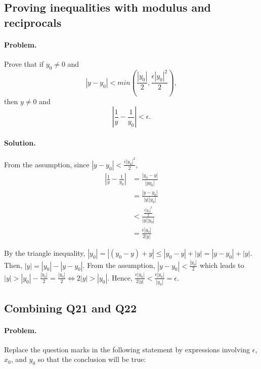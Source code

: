 \documentclass{article}
\begin{document}
\setcounter{subsection}{21}
\subsection{Proving inequalities with modulus and reciprocals}

\paragraph{Problem.} Prove that if $y_0 \neq 0$ and \begin{equation*}
  |y - y_0| < min\left(\frac{|y_0|}{2}, \frac{\epsilon|y_0|^2}{2}\right),
\end{equation*} then $y \neq 0$ and \begin{equation*}
  \left|\frac{1}{y} - \frac{1}{y_0}\right| < \epsilon.
\end{equation*}

\paragraph{Solution.} From the assumption, since $|y - y_0| < \frac{\epsilon|y_0|^2}{2}$, \begin{align*}
  \left|\frac{1}{y} - \frac{1}{y_0}\right| &= \frac{|y_0 - y|}{|yy_0|} \\
                                           &= \frac{|y - y_0|}{|y||y_0|} \\
                                           &< \frac{\frac{\epsilon|y_0|^2}{2}}{|y||y_0|} \\
                                           &= \frac{\epsilon|y_0|}{2|y|}
\end{align*}

By the triangle inequality, $|y_0| = |(y_0 - y) + y| \leq |y_0 - y| + |y| = |y - y_0| + |y|$. Then, $|y| = |y_0| - |y - y_0|$. From the assumption, $|y - y_0| < \frac{|y_0|}{2}$ which leads to $|y| > |y_0| - \frac{|y_0|}{2} = \frac{|y_0|}{2} \iff 2|y| > |y_0|$. Hence, $\frac{\epsilon|y_0|}{2|y|} < \frac{\epsilon|y_0|}{|y_0|} = \epsilon$.

\setcounter{subsection}{22}
\subsection{Combining Q21 and Q22}

\paragraph{Problem.} Replace the question marks in the following statement by expressions involving $\epsilon$, $x_0$, and $y_0$ so that the conclusion will be true:
\end{document}
